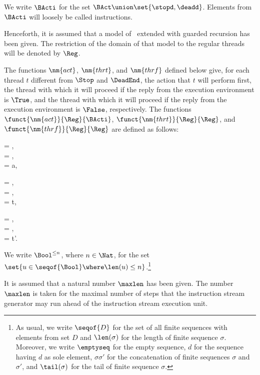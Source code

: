 \documentclass[fleqn]{llncs}
\begin{document}
We write $\BActi$ for the set $\BAct \union \set{\stopd,\deadd}$.
Elements from $\BActi$ will loosely be called instructions.

Henceforth, it is assumed that a model of \BTA\ extended with guarded
recursion has been given.
The restriction of the domain of that model to the regular threads will
be denoted by $\Reg$.

The functions $\nm{act}$, $\nm{thrt}$, and $\nm{thrf}$ defined below
give, for each thread $t$ different from $\Stop$ and $\DeadEnd$, the
action that $t$ will perform first, the thread with which it will
proceed if the reply from the execution environment is $\True$, and the
thread with which it will proceed if the reply from the execution
environment is $\False$, respectively.
The functions $\funct{\nm{act}}{\Reg}{\BActi}$,
$\funct{\nm{thrt}}{\Reg}{\Reg}$, and $\funct{\nm{thrf}}{\Reg}{\Reg}$ are
defined as follows:
\begin{ldispl}
\begin{geqns}
\act{\Stop} = \stopd\;,
\\
\act{\DeadEnd} = \deadd\;,
\\
 = a\;,
\end{geqns}
\quad
\begin{geqns}
\rest{\Stop} = \DeadEnd\;,
\\
\rest{\DeadEnd} = \DeadEnd\;,
\\
 = t\;,
\end{geqns}
\quad
\begin{geqns}
\resf{\Stop} = \DeadEnd\;,
\\
\resf{\DeadEnd} = \DeadEnd\;,
\\
 = t'\;.
\end{geqns}
\end{ldispl}

We write $\Bool^{\leq n}$, where $n \in \Nat$, for the set
$\set{u \in \seqof{\Bool} \where \len(u) \leq n}$.\footnote
{As usual, we write $\seqof{D}$ for the set of all finite sequences
 with elements from set $D$ and $\len(\sigma)$ for the length of finite
 sequence $\sigma$.
 Moreover, we write $\emptyseq$ for the empty sequence, $d$ for the
 sequence having $d$ as sole element, $\sigma \sigma'$ for the
 concatenation of finite sequences $\sigma$ and $\sigma'$, and
 $\tail(\sigma)$ for the tail of finite sequence $\sigma$.
}

It is assumed that a natural number $\maxlen$ has been given.
The number $\maxlen$ is taken for the maximal number of steps that the
instruction stream generator may run ahead of the instruction stream
execution unit.
\end{document}
